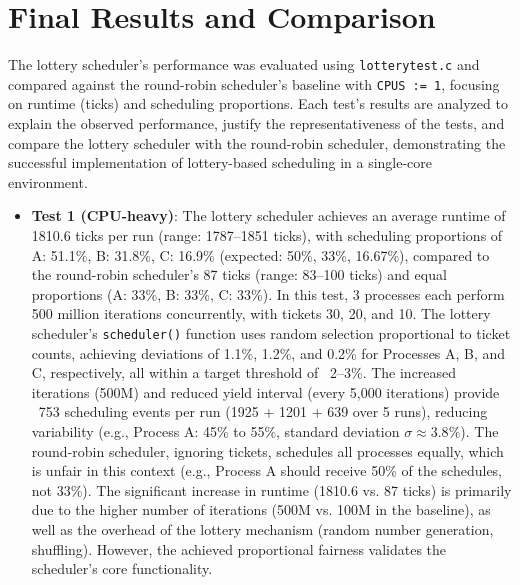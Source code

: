 \documentclass{article}
\begin{document}
\section{Final Results and Comparison}
The lottery scheduler’s performance was evaluated using \texttt{lotterytest.c} and compared against the round-robin scheduler’s baseline with \texttt{CPUS := 1}, focusing on runtime (ticks) and scheduling proportions. Each test’s results are analyzed to explain the observed performance, justify the representativeness of the tests, and compare the lottery scheduler with the round-robin scheduler, demonstrating the successful implementation of lottery-based scheduling in a single-core environment.

\begin{itemize}
    \item \textbf{Test 1 (CPU-heavy)}: The lottery scheduler achieves an average runtime of 1810.6 ticks per run (range: 1787–1851 ticks), with scheduling proportions of A: 51.1\%, B: 31.8\%, C: 16.9\% (expected: 50\%, 33\%, 16.67\%), compared to the round-robin scheduler’s 87 ticks (range: 83–100 ticks) and equal proportions (A: 33\%, B: 33\%, C: 33\%). In this test, 3 processes each perform 500 million iterations concurrently, with tickets 30, 20, and 10. The lottery scheduler’s \texttt{scheduler()} function uses random selection proportional to ticket counts, achieving deviations of 1.1\%, 1.2\%, and 0.2\% for Processes A, B, and C, respectively, all within a target threshold of ~2–3\%. The increased iterations (500M) and reduced yield interval (every 5,000 iterations) provide ~753 scheduling events per run (1925 + 1201 + 639 over 5 runs), reducing variability (e.g., Process A: 45\% to 55\%, standard deviation $\sigma \approx 3.8\%$). The round-robin scheduler, ignoring tickets, schedules all processes equally, which is unfair in this context (e.g., Process A should receive 50\% of the schedules, not 33\%). The significant increase in runtime (1810.6 vs. 87 ticks) is primarily due to the higher number of iterations (500M vs. 100M in the baseline), as well as the overhead of the lottery mechanism (random number generation, shuffling). However, the achieved proportional fairness validates the scheduler’s core functionality.
    

\end{itemize}
\end{document}
